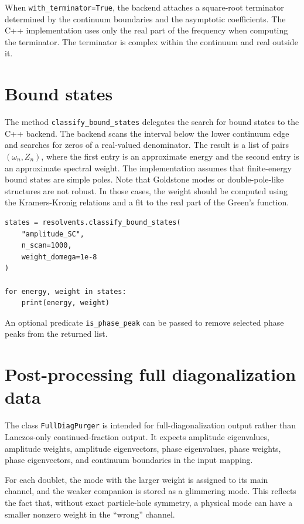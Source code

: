 \documentclass[11pt]{article}
\begin{document}
When \texttt{with\_terminator=True}, the backend attaches a square-root terminator determined by the continuum boundaries and the asymptotic coefficients.
The C++ implementation uses only the real part of the frequency when computing the terminator. 
The terminator is complex within the continuum and real outside it. 


\section{Bound states}

The method \texttt{classify\_bound\_states} delegates the search for bound states to the C++ backend. 
The backend scans the interval below the lower continuum edge and searches for zeros of a real-valued denominator. 
The result is a list of pairs $(\omega_n,Z_n)$, where the first entry is an approximate energy and the second entry is an approximate spectral weight. 
The implementation assumes that finite-energy bound states are simple poles. 
Note that Goldstone modes or double-pole-like structures are not robust.
In those cases, the weight should be computed using the Kramers-Kronig relations and a fit to the real part of the Green's function.

\begin{lstlisting}
states = resolvents.classify_bound_states(
    "amplitude_SC",
    n_scan=1000,
    weight_domega=1e-8
)

for energy, weight in states:
    print(energy, weight)
\end{lstlisting}

An optional predicate \texttt{is\_phase\_peak} can be passed to remove selected phase peaks from the returned list. 



\section{Post-processing full diagonalization data}

The class \texttt{FullDiagPurger} is intended for full-diagonalization output rather than Lanczos-only continued-fraction output. 
It expects amplitude eigenvalues, amplitude weights, amplitude eigenvectors, phase eigenvalues, phase weights, phase eigenvectors, and continuum boundaries in the input mapping. 

For each doublet, the mode with the larger weight is assigned to its main channel, and the weaker companion is stored as a glimmering mode. 
This reflects the fact that, without exact particle-hole symmetry, a physical mode can have a smaller nonzero weight in the ``wrong'' channel.
\end{document}
